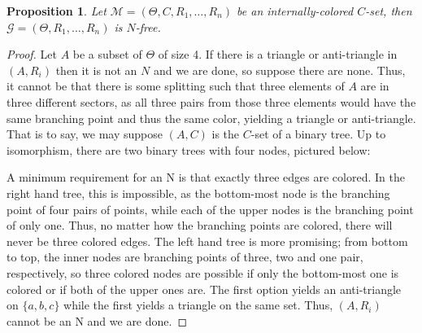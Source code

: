 \documentclass{amsart}
\newtheorem{proposition}[theorem]{Proposition}
\def\graph{\mathcal{G}}
\newcommand{\set}[1]{\{#1 \}}
\newcommand{\model}{\mathcal{M}}
\begin{document}
\begin{proposition}
    Let $\model = (\Theta, C, R_1, \dots, R_n)$ be an internally-colored $C$-set, then $\graph = (\Theta, R_1, \dots, R_n)$ is $N$-free.
\end{proposition}
\begin{proof}
    Let $A$ be a subset of $\Theta$ of size 4. If there is a triangle or anti-triangle in $(A, R_i)$ then it is not an $N$ and we are done, so suppose there are none. Thus, it cannot be that there is some splitting such that three elements of $A$ are in three different sectors, as all three pairs from those three elements would have the same branching point and thus the same color, yielding a triangle or anti-triangle. That is to say, we may suppose $(A, C)$ is the $C$-set of a binary tree. Up to isomorphism, there are two binary trees with four nodes, pictured below:
    \begin{center}
\end{center}
A minimum requirement for an N is that exactly three edges are colored. In the right hand tree, this is impossible, as the bottom-most node is the branching point of four pairs of points, while each of the upper nodes is the branching point of only one. Thus, no matter how the branching points are colored, there will never be three colored edges. The left hand tree is more promising; from bottom to top, the inner nodes are branching points of three, two and one pair, respectively, so three colored nodes are possible if only the bottom-most one is colored or if both of the upper ones are. The first option yields an anti-triangle on $\set{a,b,c}$ while the first yields a triangle on the same set. Thus, $(A, R_i)$ cannot be an N and we are done.
\end{proof}
\end{document}

